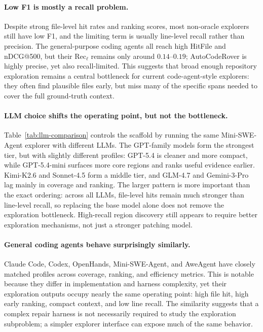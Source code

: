 \documentclass{llmxive}
\begin{document}
\paragraph{Low F1 is mostly a recall problem.}
Despite strong file-level hit rates and ranking scores, most non-oracle explorers still have low F1, and the limiting term is usually line-level recall rather than precision. The general-purpose coding agents all reach high HitFile and nDCG@500, but their Rec$_\ell$ remains only around $0.14$--$0.19$; AutoCodeRover is highly precise, yet also recall-limited. This suggests that broad enough repository exploration remains a central bottleneck for current code-agent-style explorers: they often find plausible files early, but miss many of the specific spans needed to cover the full ground-truth context.

 
\paragraph{LLM choice shifts the operating point, but not the bottleneck.}
Table~\ref{tab:llm-comparison} controls the scaffold by running the same Mini-SWE-Agent explorer with different LLMs. The GPT-family models form the strongest tier, but with slightly different profiles: GPT-5.4 is cleaner and more compact, while GPT-5.4-mini surfaces more core regions and ranks useful evidence earlier. Kimi-K2.6 and Sonnet-4.5 form a middle tier, and GLM-4.7 and Gemini-3-Pro lag mainly in coverage and ranking. The larger pattern is more important than the exact ordering: across all LLMs, file-level hits remain much stronger than line-level recall, so replacing the base model alone does not remove the exploration bottleneck. High-recall region discovery still appears to require better exploration mechanisms, not just a stronger patching model.

 
\paragraph{General coding agents behave surprisingly similarly.}
Claude Code, Codex, OpenHands, Mini-SWE-Agent, and AweAgent have closely matched profiles across coverage, ranking, and efficiency metrics. This is notable because they differ in implementation and harness complexity, yet their exploration outputs occupy nearly the same operating point: high file hit, high early ranking, compact context, and low line recall. The similarity suggests that a complex repair harness is not necessarily required to study the exploration subproblem; a simpler explorer interface can expose much of the same behavior.
\end{document}
